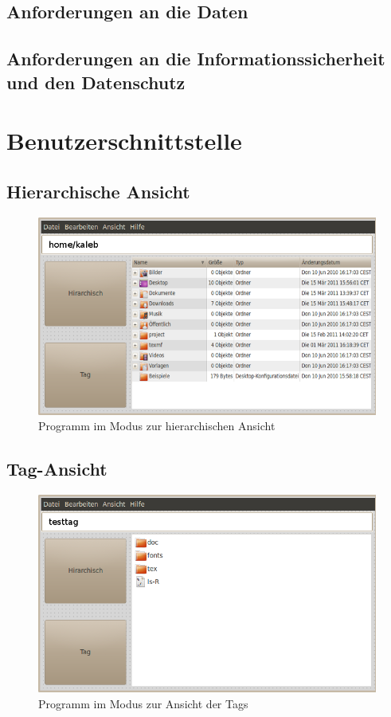 \documentclass[10pt,paper=a4,final]{scrartcl}
\begin{document}
\subsection{Anforderungen an die Daten}
\cite[4.2]{voranalyse}
\subsection{Anforderungen an die Informationssicherheit und den Datenschutz}
\cite[4.3]{voranalyse}
\newpage
\section{Benutzerschnittstelle}
\subsection{Hierarchische Ansicht}
\begin{figure}[h!]
    \includegraphics[scale=0.6]{ansicht1.png}
   \caption{Programm im Modus zur hierarchischen Ansicht}
\end{figure}
\subsection{Tag-Ansicht}
\begin{figure}[h!]
    \includegraphics[scale=0.6]{ansicht2.png}
   \caption{Programm im Modus zur Ansicht der Tags}
\end{figure}
\newpage
\end{document}
